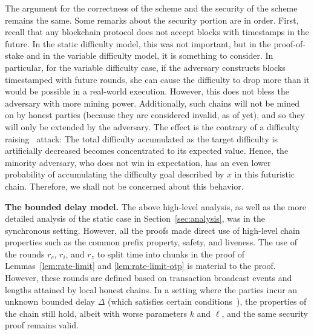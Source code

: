 The argument for the correctness of the scheme and the security of the scheme
remains the same. Some remarks about the security portion are in order. First,
recall that any blockchain protocol does not accept blocks with timestamps in
the future. In the static difficulty model, this was not important, but in the
proof-of-stake and in the variable difficulty model, it is something to consider.
In particular, for the variable difficulty case, if the adversary constructs
blocks timestamped with future rounds, she can cause the difficulty to drop
more than it would be possible in a real-world execution. However, this does
not bless the adversary with more mining power. Additionally, such chains will
not be mined on by honest parties (because they are considered invalid, as of yet),
and so they will only be extended by the adversary.
The effect is the contrary
of a difficulty raising~\cite{bahack} attack: The total difficulty accumulated
as the target difficulty is artificially decreased becomes concentrated to its expected value.
Hence, the minority adversary, who does not win in expectation, has an
even lower probability of accumulating the difficulty goal described by $x$
in this futuristic chain. Therefore, we shall not be concerned about this
behavior.

\noindent
\textbf{The bounded delay model.} The above high-level analysis, as well as
the more detailed analysis
of the static case in Section~\ref{sec:analysis}, was in the synchronous setting. However, all the proofs
made direct use of high-level chain properties such as the common prefix property,
safety, and liveness. The use of the rounds $r_c$, $r_i$, and $r_z$ to split time
into chunks in the proof of Lemmas~\ref{lem:rate-limit} and \ref{lem:rate-limit-otp} is
material to the proof. However, these
rounds are defined based on transaction broadcast events and lengths attained
by local honest chains.
In a setting where the parties incur an unknown bounded
delay $\Delta$ (which satisfies certain conditions~\cite{backbone-new}), the
properties of the chain still hold, albeit with worse parameters $k$ and $\ell$,
and the same security proof remains valid.
